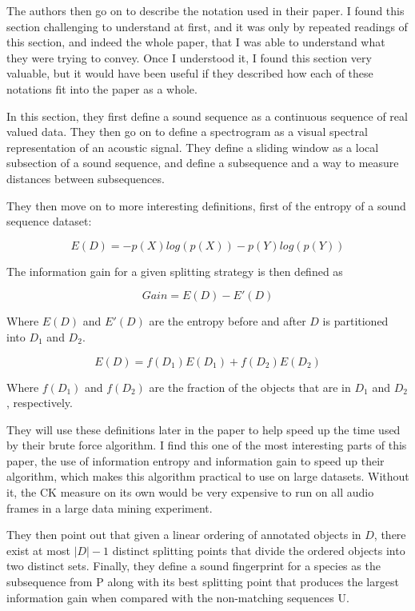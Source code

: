 The authors then go on to describe the notation used in their paper.
I found this section challenging to understand at first, and it was
only by repeated readings of this section, and indeed the whole paper,
that I was able to understand what they were trying to convey.  Once I
understood it, I found this section very valuable, but it would have
been useful if they described how each of these notations fit into the
paper as a whole.

In this section, they first define a sound sequence as a continuous
sequence of real valued data.  They then go on to define a spectrogram
as a visual spectral representation of an acoustic signal.  They
define a sliding window as a local subsection of a sound sequence, and
define a subsequence and a way to measure distances between
subsequences.

They then move on to more interesting definitions, first of the
entropy of a sound sequence dataset:

	\[ E(D) = -p(X)log(p(X)) - p(Y)log(p(Y)) \]

The information gain for a given splitting strategy is then defined as

	\[ Gain = E(D) - E'(D) \]

Where $E(D)$ and $E'(D)$ are the entropy before and after $D$ is
partitioned into $D_1$ and $D_2$.

	\[ E(D) = f(D_1)E(D_1) + f(D_2)E(D_2) \] 

Where $f(D_1)$ and $f(D_2)$ are the fraction of the objects that are
in $D_1$ and $D_2$, respectively.

They will use these definitions later in the paper to help speed up
the time used by their brute force algorithm.  I find this one of the
most interesting parts of this paper, the use of information entropy
and information gain to speed up their algorithm, which makes this
algorithm practical to use on large datasets.  Without it, the CK
measure on its own would be very expensive to run on all audio frames
in a large data mining experiment.

They then point out that given a linear ordering of annotated objects
in $D$, there exist at most $|D|-1$ distinct splitting points that
divide the ordered objects into two distinct sets.  Finally, they
define a sound fingerprint for a species as the subsequence from P
along with its best splitting point that produces the largest
information gain when compared with the non-matching sequences U.

